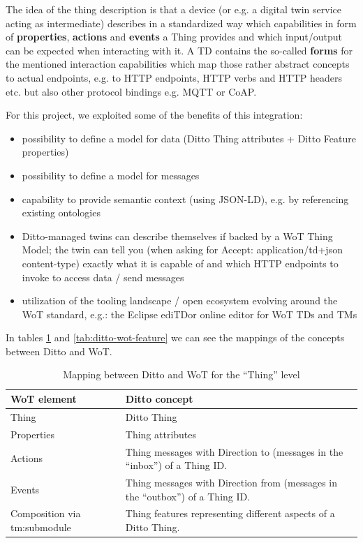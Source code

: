 The idea of the thing description is that a device (or e.g. a digital twin service acting as intermediate) describes in a standardized way which capabilities in form of \textbf{properties}, \textbf{actions} and \textbf{events} a Thing provides and which input/output can be expected when interacting with it.
A TD contains the so-called \textbf{forms} for the mentioned interaction capabilities which map those rather abstract concepts to actual endpoints, e.g. to HTTP endpoints, HTTP verbs and HTTP headers etc. but also other protocol bindings e.g. MQTT or CoAP.

For this project, we exploited some of the benefits of this integration:
\begin{itemize}
	\item possibility to define a model for data (Ditto Thing attributes + Ditto Feature properties)
	\item possibility to define a model for messages
	\item capability to provide semantic context (using JSON-LD), e.g. by referencing existing ontologies
	\item Ditto-managed twins can describe themselves if backed by a WoT Thing Model; the twin can tell you (when asking for Accept: application/td+json content-type) exactly what it is capable of and which HTTP endpoints to invoke to access data / send messages
	\item utilization of the tooling landscape / open ecosystem evolving around the WoT standard, e.g.:
	      the Eclipse edi{TD}or online editor for WoT TDs and TMs
\end{itemize}

In tables \ref{tab:ditto-wot-thing} and \ref{tab:ditto-wot-feature} we can see the mappings of the concepts between Ditto and WoT.

\begin{table}[H]
	\begin{tabular}{|p{}|p{}|}
		\hline
		\textbf{WoT element}         & \textbf{Ditto concept}                                                         \\ \hline
		Thing                        & Ditto Thing                                                                    \\ \hline
		Properties                   & Thing attributes                                                               \\ \hline
		Actions                      & Thing messages with Direction to (messages in the ``inbox'') of a Thing ID.    \\ \hline
		Events                       & Thing messages with Direction from (messages in the ``outbox'') of a Thing ID. \\ \hline
		Composition via tm:submodule & Thing features representing different aspects of a Ditto Thing.                \\ \hline
	\end{tabular}
	\caption{Mapping between Ditto and WoT for the ``Thing'' level}
	\label{tab:ditto-wot-thing}
\end{table}

